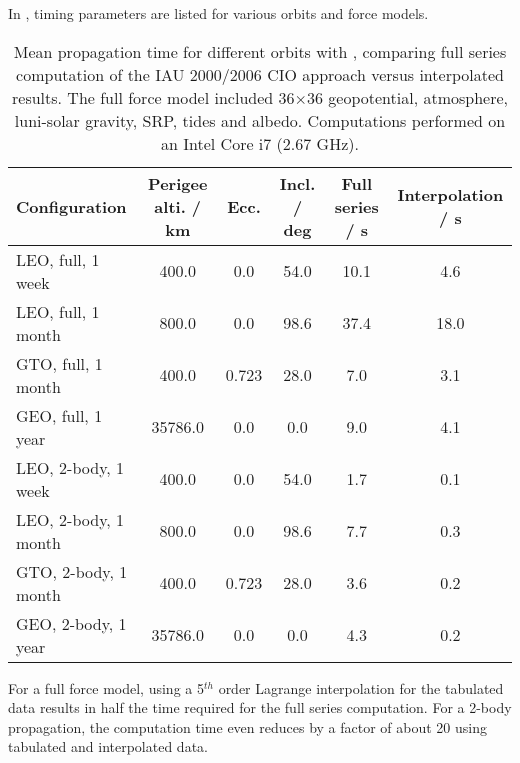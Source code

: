 In , timing parameters are listed for various orbits and force models.
\begin{table}[h!]
 \centering
 \caption{Mean propagation time for different orbits with \neptune, comparing full series computation of the IAU 2000/2006 CIO approach 
 versus interpolated results. The full force model included 36$\times$36 geopotential, atmosphere, luni-solar gravity, SRP, tides and albedo. Computations performed on an
Intel\textsuperscript{\textregistered} Core\textsuperscript{\texttrademark} i7 (2.67 GHz). \label{tab:comparison-nutation-precession}}
 \begin{tabular}{@{}p{4cm}SSSSS@{}}
  \toprule
  {Configuration}               & {Perigee alti. / \si{\kilo\metre}}     & {Ecc.}  & {Incl. / deg} & {Full series / \si{\second}} & {Interpolation / \si{\second}} \\
  \midrule
  LEO, full, 1 week                   & 400.0                                  & 0.0     & 54.0          & 10.1                       & 4.6  \\
  LEO, full, 1 month                  & 800.0                                  & 0.0     & 98.6          & 37.4                       & 18.0 \\
  GTO, full, 1 month                  & 400.0                                  & 0.723   & 28.0          &  7.0                       & 3.1 \\
  GEO, full, 1 year                   & 35786.0                                & 0.0     & 0.0           &  9.0                       & 4.1 \\
  \midrule
  LEO, 2-body, 1 week                   & 400.0                                  & 0.0     & 54.0          &  1.7                      &  0.1 \\
  LEO, 2-body, 1 month                  & 800.0                                  & 0.0     & 98.6          &  7.7                      &  0.3 \\
  GTO, 2-body, 1 month                  & 400.0                                  & 0.723   & 28.0          &  3.6                       & 0.2 \\
  GEO, 2-body, 1 year                   & 35786.0                                & 0.0     & 0.0           &  4.3                       & 0.2 \\
  \bottomrule  
 \end{tabular}
\end{table}
 For a full force model, using a 5$^{th}$ order Lagrange interpolation for the tabulated data results in half the time required for the full series computation. 
 For a 2-body propagation, the computation time even reduces by a factor of about \num{20} using tabulated and interpolated data.




